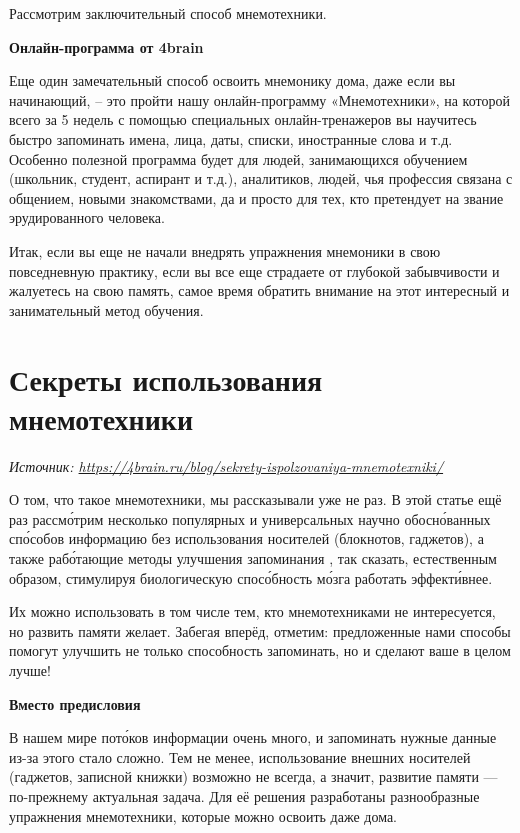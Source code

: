 Рассмотрим заключительный способ мнемотехники.

\textbf{Онлайн-программа от 4brain}

Еще один замечательный способ освоить мнемонику дома, даже если вы начинающий, – это пройти нашу онлайн-программу «Мнемотехники», на которой всего за 5 недель с помощью специальных онлайн-тренажеров вы научитесь быстро запоминать имена, лица, даты, списки, иностранные слова и т.д. Особенно полезной программа будет для людей, занимающихся обучением (школьник, студент, аспирант и т.д.), аналитиков, людей, чья профессия связана с общением, новыми знакомствами, да и просто для тех, кто претендует на звание эрудированного человека.

Итак, если вы еще не начали внедрять упражнения мнемоники в свою повседневную практику, если вы все еще страдаете от глубокой забывчивости и жалуетесь на свою память, самое время обратить внимание на этот интересный и занимательный метод обучения.

\newpage
\section{Секреты использования мнемотехники}

\textit{Источник: \url{https://4brain.ru/blog/sekrety-ispolzovaniya-mnemotexniki/}}

О том, что такое мнемотехники, мы рассказывали уже не раз. В этой статье ещё раз рассм\'{о}трим несколько популярных и универсальных научно обосн\'{о}ванных сп\'{о}собов  информацию без использования  носителей (блокнотов, гаджетов), а также раб\'{о}тающие методы улучшения запоминания , так сказать, естественным образом, стимулируя биологическую спос\'{о}бность м\'{о}зга работать эффект\'{и}внее.

Их можно использовать в том числе тем, кто  мнемотехниками не интересуется, но развить  памяти желает. Забегая вперёд, отметим: предложенные нами способы помогут улучшить не только способность запоминать, но и сделают ваше  в целом лучше!

\textbf{Вместо предисловия}

В нашем мире пот\'{о}ков информации очень много,  и запоминать нужные данные из-за этого стало сложно. Тем не менее, использование внешних носителей (гаджетов, записной книжки) возможно не всегда, а значит, развитие памяти --- по-прежнему актуальная задача. Для её решения разработаны разнообразные упражнения мнемотехники, которые можно освоить даже дома.

